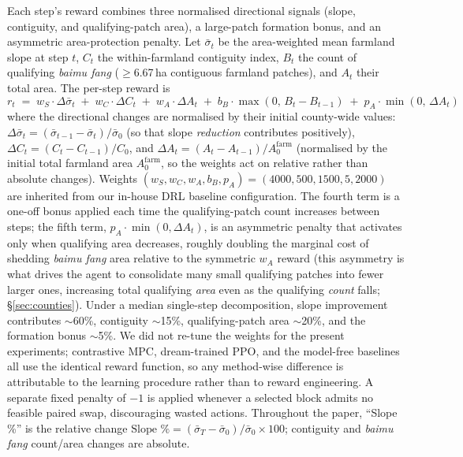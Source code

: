 \documentclass[11pt]{article}
\begin{document}
Each step's reward combines three normalised directional signals (slope, contiguity, and qualifying-patch area), a large-patch formation bonus, and an asymmetric area-protection penalty. Let $\bar{\sigma}_t$ be the area-weighted mean farmland slope at step $t$, $C_t$ the within-farmland contiguity index, $B_t$ the count of qualifying \textit{baimu fang} ($\geq$6.67\,ha contiguous farmland patches), and $A_t$ their total area. The per-step reward is
\begin{equation}
\label{eq:reward}
r_t \;=\; w_S \cdot \Delta \bar{\sigma}_t
       \;+\; w_C \cdot \Delta C_t
       \;+\; w_A \cdot \Delta A_t
       \;+\; b_B \cdot \max(0,\, B_t - B_{t-1})
       \;+\; p_A \cdot \min(0,\, \Delta A_t)
\end{equation}
where the directional changes are normalised by their initial county-wide values: $\Delta \bar{\sigma}_t = (\bar{\sigma}_{t-1} - \bar{\sigma}_t)/\bar{\sigma}_0$ (so that slope \emph{reduction} contributes positively), $\Delta C_t = (C_t - C_{t-1})/C_0$, and $\Delta A_t = (A_t - A_{t-1})/A_0^{\mathrm{farm}}$ (normalised by the initial total farmland area $A_0^{\mathrm{farm}}$, so the weights act on relative rather than absolute changes). Weights $(w_S, w_C, w_A, b_B, p_A) = (4000, 500, 1500, 5, 2000)$ are inherited from our in-house DRL baseline configuration. The fourth term is a one-off bonus applied each time the qualifying-patch count increases between steps; the fifth term, $p_A \cdot \min(0, \Delta A_t)$, is an asymmetric penalty that activates only when qualifying area decreases, roughly doubling the marginal cost of shedding \textit{baimu fang} area relative to the symmetric $w_A$ reward (this asymmetry is what drives the agent to consolidate many small qualifying patches into fewer larger ones, increasing total qualifying \emph{area} even as the qualifying \emph{count} falls; \S\ref{sec:counties}). Under a median single-step decomposition, slope improvement contributes $\sim$60\%, contiguity $\sim$15\%, qualifying-patch area $\sim$20\%, and the formation bonus $\sim$5\%. We did not re-tune the weights for the present experiments; contrastive MPC, dream-trained PPO, and the model-free baselines all use the identical reward function, so any method-wise difference is attributable to the learning procedure rather than to reward engineering. A separate fixed penalty of $-1$ is applied whenever a selected block admits no feasible paired swap, discouraging wasted actions. Throughout the paper, ``Slope \%'' is the relative change $\text{Slope \%} = (\bar{\sigma}_T - \bar{\sigma}_0)/\bar{\sigma}_0 \times 100$; contiguity and \textit{baimu fang} count/area changes are absolute.
\end{document}
